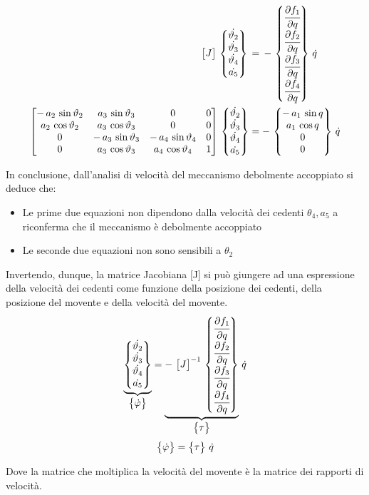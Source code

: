 		\begin{align*}
		\begin{bmatrix}J\end{bmatrix}\,\begin{Bmatrix}\dot{\vartheta_2}\\\dot{\vartheta_3}\\\dot{\vartheta_4}\\\dot{a_5}\end{Bmatrix}\,&=\,-\,\begin{Bmatrix}\cfrac{\partial f_1}{\partial q}\\\cfrac{\partial f_2}{\partial q}\\\cfrac{\partial f_3}{\partial q}\\\cfrac{\partial f_4}{\partial q}\end{Bmatrix}\,\dot{q}\\
		\begin{bmatrix}-\,a_2\,\sin{\vartheta_2} & a_3\,\sin{\vartheta_3} & 0 & 0\\
		a_2\,\cos{\vartheta_2} & a_3\,\cos{\vartheta_3} & 0 & 0\\
		0 & -\,a_3\,\sin{\vartheta_3} & -\,a_4\,\sin{\vartheta_4} & 0 \\
		0 & a_3\,\cos{\vartheta_3} & a_4\,\cos{\vartheta_4} & 1\end{bmatrix}\,\begin{Bmatrix}\dot{\vartheta_2}\\\dot{\vartheta_3}\\\dot{\vartheta_4}\\\dot{a_5}\end{Bmatrix} &= -\,\begin{Bmatrix}-\,a_1\,\sin{q}\\ a_1\,\cos{q}\\0\\0\end{Bmatrix}\,\dot{q}
		\end{align*}
		
		In conclusione, dall'analisi di velocità del meccanismo debolmente accoppiato si deduce che:
		\begin{itemize}
		\item Le prime due equazioni non dipendono dalla velocità dei cedenti $\theta_4,a_5$ a riconferma che il meccanismo è debolmente accoppiato
		\item Le seconde due equazioni non sono sensibili a $\theta_2$ 
		\end{itemize}
	
		Invertendo, dunque, la matrice Jacobiana [J] si può giungere ad una espressione della velocità dei cedenti come funzione della posizione dei cedenti, della posizione del movente e della velocità del movente.
			\[
		\underbrace{\begin{Bmatrix}\dot{\vartheta_2}\\\dot{\vartheta_3}\\\dot{\vartheta_4}\\\dot{a_5}\end{Bmatrix}}_{\begin{Bmatrix}\dot{\varphi}\end{Bmatrix}} = \underbrace{-\,\begin{bmatrix}J\end{bmatrix}^{-1}\,\begin{Bmatrix}\cfrac{\partial f_1}{\partial q}\\\cfrac{\partial f_2}{\partial q}\\\cfrac{\partial f_3}{\partial q}\\\cfrac{\partial f_4}{\partial q}\end{Bmatrix}}_{\begin{Bmatrix}\tau\end{Bmatrix}}\,\dot{q}\]
		\[\begin{Bmatrix}\dot{\varphi}\end{Bmatrix} = \begin{Bmatrix}\tau\end{Bmatrix}\,\dot{q}\]

		Dove la matrice che moltiplica la velocità del movente è la matrice dei rapporti di velocità.
		
